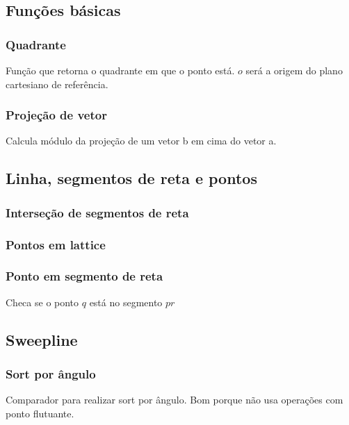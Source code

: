 
\subsection{Fun\c{c}\~{o}es b\'{a}sicas}
\subsubsection{Quadrante}
Fun\c{c}\~{a}o que retorna o quadrante em que o ponto est\'{a}. $o$ ser\'{a} a origem do plano cartesiano de refer\^{e}ncia.
\divisor

\subsubsection{Proje\c{c}\~{a}o de vetor}
Calcula m\'{o}dulo da proje\c{c}\~{a}o de um vetor b em cima do vetor a.
\divisor



\subsection{Linha, segmentos de reta e pontos}

\subsubsection{Interse\c{c}\~{a}o de segmentos de reta}
\divisor

\subsubsection{Pontos em lattice}
\divisor

\subsubsection{Ponto em segmento de reta}
Checa se o ponto $q$ est\'{a} no segmento $pr$
\divisor

\subsection{Sweepline}
\subsubsection{Sort por \^{a}ngulo}
Comparador para realizar sort por \^{a}ngulo. Bom porque n\~{a}o usa opera\c{c}\~{o}es com ponto flutuante.
\divisor
